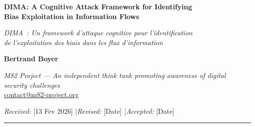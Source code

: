 \documentclass[11pt,a4paper]{article}
\begin{document}
\begin{center}

\vspace{1cm}
{\LARGE\bfseries DIMA: A Cognitive Attack Framework for Identifying\\
Bias Exploitation in Information Flows\par}
\vspace{0.5cm}
{\large\itshape\color{headerGray} DIMA~: Un framework d'attaque cognitive pour l'identification\\
de l'exploitation des biais dans les flux d'information\par}
\vspace{0.8cm}
{\large\textbf{Bertrand Boyer}\par}
\vspace{0.2cm}
{\normalsize\textit{M82 Project --- An independent think tank promoting awareness of digital security challenges}\\
\href{mailto:contact@m82-project.org}{contact@m82-project.org}\par}
\vspace{0.5cm}
{\small\textit{Received:} [13 Fev 2026] \quad|\quad \textit{Revised:} [Date] \quad|\quad \textit{Accepted:} [Date]\par}
 
\vspace{0.5cm}
\rule{\textwidth}{0.5pt}
\vspace{0.3cm}


\end{center}
\end{document}
